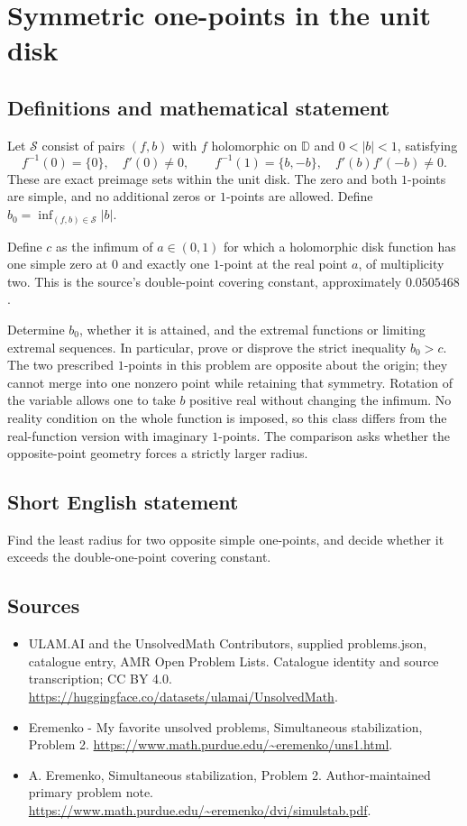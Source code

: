 \documentclass[11pt,a4paper]{article}
\begin{document}
\section*{Symmetric one-points in the unit disk}\label{statement}

\subsection{Definitions and mathematical statement}
Let $\mathcal S$ consist of pairs $(f,b)$
with $f$ holomorphic on $\mathbb D$ and
$0<|b|<1$, satisfying
\[
 f^{-1}(0)=\{0\},\quad f'(0)\ne0,\qquad
 f^{-1}(1)=\{b,-b\},\quad f'(b)f'(-b)\ne0.
\]
These are exact preimage sets within the
unit disk. The zero and both $1$-points
are simple, and no additional zeros or
$1$-points are allowed. Define
$b_0=\inf_{(f,b)\in\mathcal S}|b|$.

Define $c$ as the infimum of $a\in(0,1)$
for which a holomorphic disk function has
one simple zero at $0$ and exactly one
$1$-point at the real point $a$, of
multiplicity two. This is the source's
double-point covering constant, approximately
$0.0505468$.

Determine $b_0$, whether it is attained,
and the extremal functions or limiting
extremal sequences. In particular, prove
or disprove the strict inequality $b_0>c$.
The two prescribed $1$-points in this
problem are opposite about the origin;
they cannot merge into one nonzero point
while retaining that symmetry.
Rotation of the variable allows one to
take $b$ positive real without changing
the infimum. No reality condition on the
whole function is imposed, so this class
differs from the real-function version
with imaginary $1$-points. The comparison
asks whether the opposite-point geometry
forces a strictly larger radius.
\subsection{Short English statement}
Find the least radius for two opposite simple one-points, and decide whether it exceeds the double-one-point covering constant.
\subsection{Sources}
\begin{itemize}
\item[S1] ULAM.AI and the UnsolvedMath Contributors, supplied problems.json, catalogue entry, AMR Open Problem Lists. Catalogue identity and source transcription; CC BY 4.0.
\url{https://huggingface.co/datasets/ulamai/UnsolvedMath}.
\item[S2] Eremenko - My favorite unsolved problems, Simultaneous stabilization, Problem 2. 
\url{https://www.math.purdue.edu/~eremenko/uns1.html}.
\item[S3] A. Eremenko, Simultaneous stabilization, Problem 2. Author-maintained primary problem note.
\url{https://www.math.purdue.edu/~eremenko/dvi/simulstab.pdf}.
\end{itemize}
\end{document}
